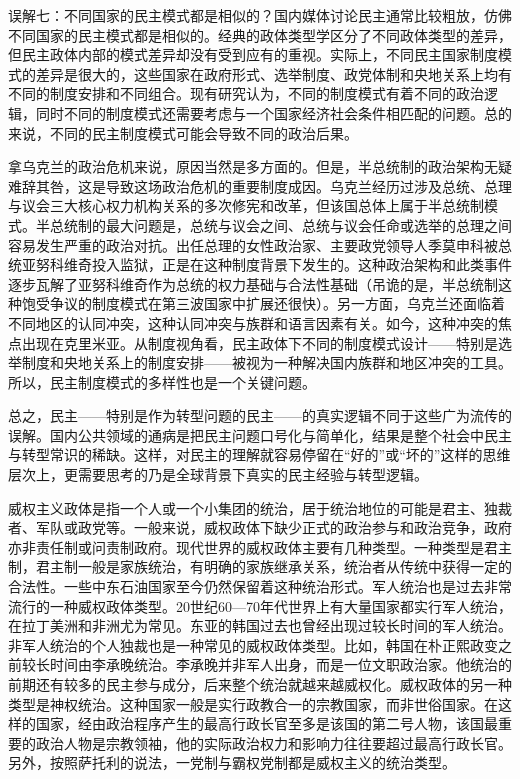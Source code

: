 误解七：不同国家的民主模式都是相似的？国内媒体讨论民主通常比较粗放，仿佛不同国家的民主模式都是相似的。经典的政体类型学区分了不同政体类型的差异，但民主政体内部的模式差异却没有受到应有的重视。实际上，不同民主国家制度模式的差异是很大的，这些国家在政府形式、选举制度、政党体制和央地关系上均有不同的制度安排和不同组合。现有研究认为，不同的制度模式有着不同的政治逻辑，同时不同的制度模式还需要考虑与一个国家经济社会条件相匹配的问题。总的来说，不同的民主制度模式可能会导致不同的政治后果。

拿乌克兰的政治危机来说，原因当然是多方面的。但是，半总统制的政治架构无疑难辞其咎，这是导致这场政治危机的重要制度成因。乌克兰经历过涉及总统、总理与议会三大核心权力机构关系的多次修宪和改革，但该国总体上属于半总统制模式。半总统制的最大问题是，总统与议会之间、总统与议会任命或选举的总理之间容易发生严重的政治对抗。出任总理的女性政治家、主要政党领导人季莫申科被总统亚努科维奇投入监狱，正是在这种制度背景下发生的。这种政治架构和此类事件逐步瓦解了亚努科维奇作为总统的权力基础与合法性基础（吊诡的是，半总统制这种饱受争议的制度模式在第三波国家中扩展还很快）。另一方面，乌克兰还面临着不同地区的认同冲突，这种认同冲突与族群和语言因素有关。如今，这种冲突的焦点出现在克里米亚。从制度视角看，民主政体下不同的制度模式设计——特别是选举制度和央地关系上的制度安排——被视为一种解决国内族群和地区冲突的工具。所以，民主制度模式的多样性也是一个关键问题。

总之，民主——特别是作为转型问题的民主——的真实逻辑不同于这些广为流传的误解。国内公共领域的通病是把民主问题口号化与简单化，结果是整个社会中民主与转型常识的稀缺。这样，对民主的理解就容易停留在“好的”或“坏的”这样的思维层次上，更需要思考的乃是全球背景下真实的民主经验与转型逻辑。


威权主义政体是指一个人或一个小集团的统治，居于统治地位的可能是君主、独裁者、军队或政党等。一般来说，威权政体下缺少正式的政治参与和政治竞争，政府亦非责任制或问责制政府。现代世界的威权政体主要有几种类型。一种类型是君主制，君主制一般是家族统治，有明确的家族继承关系，统治者从传统中获得一定的合法性。一些中东石油国家至今仍然保留着这种统治形式。军人统治也是过去非常流行的一种威权政体类型。20世纪60—70年代世界上有大量国家都实行军人统治，在拉丁美洲和非洲尤为常见。东亚的韩国过去也曾经出现过较长时间的军人统治。非军人统治的个人独裁也是一种常见的威权政体类型。比如，韩国在朴正熙政变之前较长时间由李承晚统治。李承晚并非军人出身，而是一位文职政治家。他统治的前期还有较多的民主参与成分，后来整个统治就越来越威权化。威权政体的另一种类型是神权统治。这种国家一般是实行政教合一的宗教国家，而非世俗国家。在这样的国家，经由政治程序产生的最高行政长官至多是该国的第二号人物，该国最重要的政治人物是宗教领袖，他的实际政治权力和影响力往往要超过最高行政长官。另外，按照萨托利的说法，一党制与霸权党制都是威权主义的统治类型。

